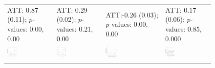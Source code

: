 \documentclass[12pt]{article}
\begin{document}
\begin{figure}[!th]
\begin{minipage}{1\linewidth}
{{\begin{tabular}{C{3.8cm}C{3.8cm}C{3.8cm}C{3.8cm}}
   \citet{Fouirnaies2018ajps} \newline ATT:  0.87 (0.11); \newline $p$-values: 0.00, 0.00 &
   \citet{fh2018} \newline ATT:  0.29 (0.02); \newline $p$-values: 0.21, 0.00 &
   \citet{Fouirnaies2022} \newline ATT:-0.26 (0.03); \newline $p$-values: 0.00, 0.00 & 
    \citet{Fresh2018} \newline  ATT: 0.17 (0.06); \newline $p$-values: 0.85, 0.000\\   
   \hspace{-2em} \includegraphics[width = 0.22\textwidth]{figure/fect/Fouirnaies_fect_entry.png} &
   \hspace{-2em}  \includegraphics[width = 0.22\textwidth]{figure/fect/FouirnaiesHall_fect_entry.png} & 
   \hspace{-2em} \includegraphics[width = 0.22\textwidth]{figure/fect/Fouirnaies2022_fect_entry.png}  &
    \hspace{-2em}  \includegraphics[width = 0.22\textwidth]{figure/fect/Fresh_fect_entry.png}\\ \\ 

\end{tabular}}}
\end{minipage}
\end{figure}
\end{document}
